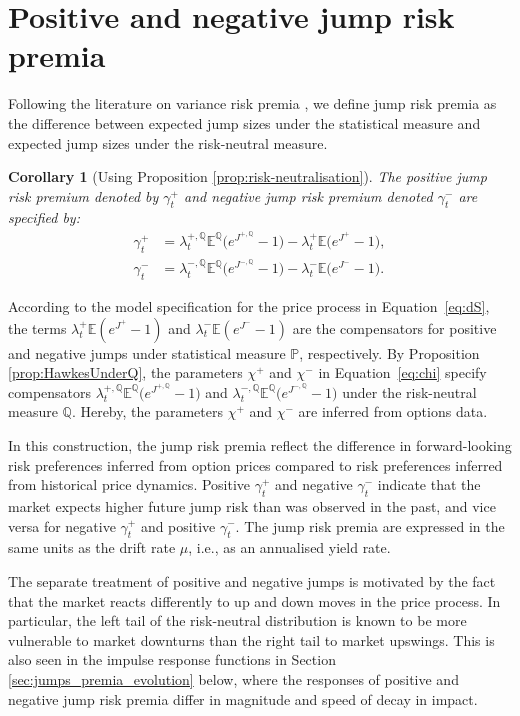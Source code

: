 \documentclass[11pt,a4paper]{article}
\numberwithin{equation}{section}
\newtheorem{corollary}[theorem]{Corollary}
\theoremstyle{remark}
\theoremstyle{definition}
\newcommand{\E}{{\mathbb{E}}}
\newcommand{\p}{{\mathbb P}}
\newcommand{\q}{{\mathbb Q}}
\begin{document}
\section{Positive and negative jump risk premia}\label{sec:jumps_premia}

Following the literature on variance risk premia \citep[e.g.][]{Carr2009,bollerslev2009expected,almeida2024risk}, we define jump risk premia as the difference between expected jump sizes under the statistical measure and expected jump sizes under the risk-neutral measure.

\begin{corollary}[Using Proposition \ref{prop:risk-neutralisation}]
The positive jump risk premium denoted by $\gamma^+_t$ and negative jump risk premium denoted $\gamma^-_t$ are specified by:
\begin{align}
    \gamma^+_t & = \lambda^{+, \mathbb{Q}}_t \E^\mathbb{Q}\big(e^{J^{+,\q}}-1\big) -  \lambda^{+}_t \E\big(e^{J^+}-1\big),\label{eq:gamma_p}\\
    \gamma^-_t &= \lambda^{-, \mathbb{Q}}_t \E^\mathbb{Q}\big(e^{J^{-,\q}}-1\big) -  \lambda^{-}_t \E\big(e^{J^-}-1\big)\label{eq:gamma_m}.
\end{align}
\end{corollary}

According to the model specification for the price process in Equation~\eqref{eq:dS},
the terms $\lambda_t^+\E(e^{J^+}-1)$ and $\lambda_t^-\E(e^{J^-}-1)$ are the compensators for positive and negative jumps under statistical measure $\p$, respectively. By Proposition \ref{prop:HawkesUnderQ}, the parameters $\chi^+$ and $\chi^-$ in Equation~\eqref{eq:chi} specify compensators $\lambda^{+, \mathbb{Q}}_t \E^\mathbb{Q}\big(e^{J^{+,\q}}-1\big)$ and $\lambda^{-, \mathbb{Q}}_t \E^\mathbb{Q}\big(e^{J^{-,\q}}-1\big)$ under the risk-neutral measure $\q$. Hereby, the parameters $\chi^+$ and $\chi^-$ are inferred from options data.

In this construction, the jump risk premia reflect the difference in forward-looking risk preferences inferred from option prices compared to risk preferences inferred from historical price dynamics. Positive $\gamma_t^+$ and negative $\gamma_t^-$ indicate that the market expects higher future jump risk than was observed in the past, and vice versa for negative $\gamma_t^+$ and positive $\gamma_t^-$.
The jump risk premia are expressed in the same units as the drift rate $\mu$, i.e., as an annualised yield rate.

The separate treatment of positive and negative jumps is motivated by the fact that the market reacts differently to up and down moves in the price process. In particular, the left tail of the risk-neutral distribution is known to be more vulnerable to market downturns than the right tail to market upswings.  This is also seen in the impulse response functions in Section \ref{sec:jumps_premia_evolution} below, where the responses of positive and negative jump risk premia differ in magnitude and speed of decay in impact.
\end{document}
